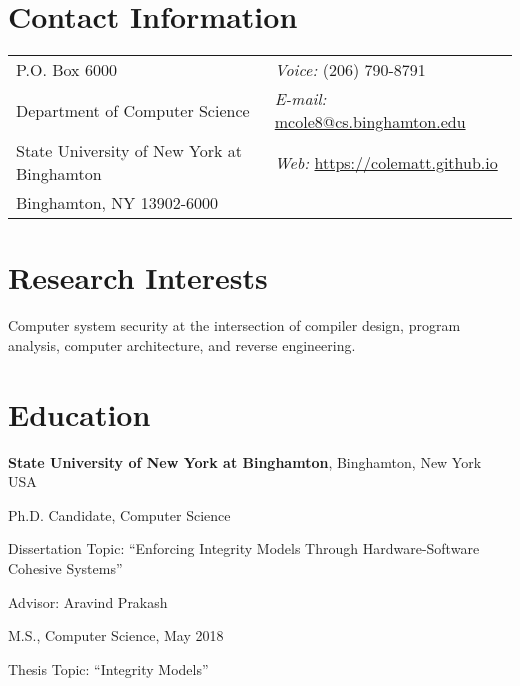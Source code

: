 \documentclass[margin,line]{res}
\begin{document}

\begin{resume}

\section{\sc Contact Information}
\vspace{.05in}
\begin{tabular}{@{}p{3in}p{4in}}
P.O. Box 6000                               & {\it Voice:}  (206) 790-8791\\
Department of Computer Science              & {\it E-mail:} \href{mailto:mcole8@cs.binghamton.edu}{mcole8@cs.binghamton.edu}\\
State University of New York at Binghamton  & {\it Web:} \url{https://colematt.github.io}\\
Binghamton, NY 13902-6000                   &
\end{tabular}

\section{\sc Research Interests}
Computer system security at the intersection of compiler design, program analysis, computer architecture, and reverse engineering.

\section{\sc Education}
{\bf State University of New York at Binghamton}, Binghamton, New York USA\\
\vspace*{-.1in}
\begin{list1}
\item[] Ph.D. Candidate, Computer Science
\begin{list2}
\vspace*{.05in}
\item Dissertation Topic: ``Enforcing Integrity Models Through Hardware-Software Cohesive Systems''
\item Advisor: Aravind Prakash
\end{list2}
\vspace*{.05in}
\item[] M.S., Computer Science,  May 2018
\begin{list2}
\vspace*{.05in}
\item Thesis Topic: ``Integrity Models''
\end{list2}
\end{list1}


\end{resume}
\end{document}
